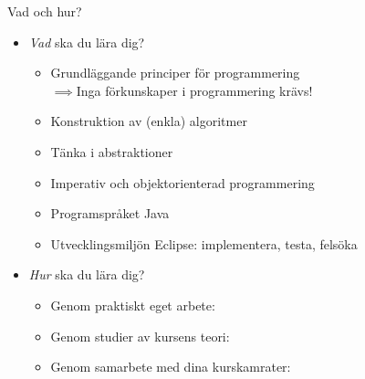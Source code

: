 

\begin{Slide}{Vad och hur?}
\begin{itemize}
\item \emph{Vad} ska du lära dig?
\begin{itemize}
\item Grundläggande principer för programmering\\ $\implies$Inga förkunskaper i programmering krävs!
\item Konstruktion av (enkla) algoritmer
\item Tänka i abstraktioner
\item Imperativ och objektorienterad programmering
\item Programspråket Java
\item Utvecklingsmiljön Eclipse: implementera, testa, felsöka
\end{itemize}

\item \emph{Hur} ska du lära dig?
\begin{itemize}
\item Genom praktiskt eget arbete: 
\item Genom studier av kursens teori: 
\item Genom samarbete med dina kurskamrater: 
\end{itemize}
\end{itemize}
\end{Slide}


